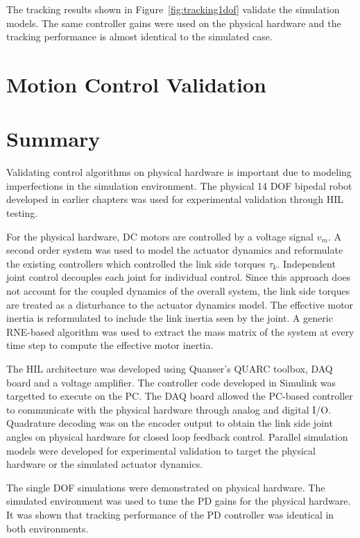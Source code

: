 The tracking results shown in Figure~\ref{fig:tracking1dof} validate the simulation models. The same controller gains were used on the physical hardware and the tracking performance is almost identical to the simulated case.   

\Incomplete

\section{Motion Control Validation} %
\label{sec:motion_control_validation}
\Incomplete

\section{Summary} %
\label{sec:experiments_summary}
Validating control algorithms on physical hardware is important due to modeling imperfections in the simulation environment. The physical 14 DOF bipedal robot developed in earlier chapters was used for experimental validation through HIL testing. 

For the physical hardware, DC motors are controlled by a voltage signal $v_m$. A second order system was used to model the actuator dynamics and reformulate the existing controllers which controlled the link side torques $\tau _k$. Independent joint control decouples each joint for individual control. Since this approach does not account for the coupled dynamics of the overall system, the link side torques are treated as a disturbance to the actuator dynamics model. The effective motor inertia is reformulated to include the link inertia seen by the joint. A generic RNE-based algorithm was used to extract the mass matrix of the system at every time step to compute the effective motor inertia.

The HIL architecture was developed using Quanser's QUARC toolbox, DAQ board and a voltage amplifier. The controller code developed in Simulink was targetted to execute on the PC. The DAQ board allowed the PC-based controller to communicate with the physical hardware through analog and digital I/O. Quadrature decoding was on the encoder output to obtain the link side joint angles on physical hardware for closed loop feedback control. Parallel simulation models were developed for experimental validation to target the physical hardware or the simulated actuator dynamics. 

The single DOF simulations were demonstrated on physical hardware. The simulated environment was used to tune the PD gains for the physical hardware. It was shown that tracking performance of the PD controller was identical in both environments.  

\Incomplete

